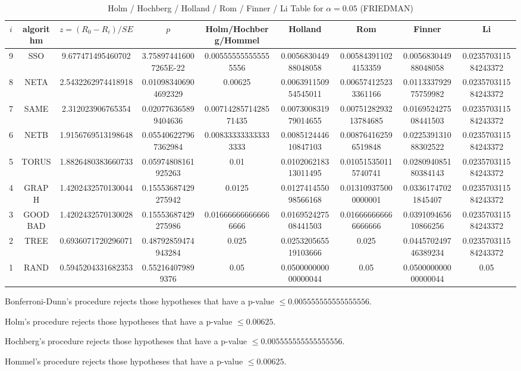 \documentclass[a4paper,10pt]{article}
\begin{document}
\begin{landscape}
\begin{table}[!htp]
\centering\scriptsize
\caption{Holm / Hochberg / Holland / Rom / Finner / Li Table for $\alpha=0.05$ (FRIEDMAN)}
\begin{tabular}{ccccccccc}
$i$&algorithm&$z=(R_0 - R_i)/SE$&$p$&Holm/Hochberg/Hommel&Holland&Rom&Finner&Li\\
\hline
9& SSO&9.677471495460702&3.758974416007265E-22&0.005555555555555556&0.005683044988048058&0.005843911024153359&0.005683044988048058&0.023570311584243372\\
8& NETA&2.5432262974418918&0.010983406904692329&0.00625&0.006391150954545011&0.006574125233361166&0.011333792975759982&0.023570311584243372\\
7& SAME&2.312023906765354&0.020776365899404636&0.0071428571428571435&0.007300831979014655&0.0075128293213784685&0.016952427508441503&0.023570311584243372\\
6& NETB&1.9156769513198648&0.055406227967362984&0.008333333333333333&0.008512444610847103&0.008764162596519848&0.022539131088302522&0.023570311584243372\\
5& TORUS&1.8826480383660733&0.05974808161925263&0.01&0.010206218313011495&0.010515350115740741&0.028094085180384143&0.023570311584243372\\
4& GRAPH&1.4202432570130044&0.15553687429275942&0.0125&0.012741455098566168&0.013109375000000001&0.03361747021845407&0.023570311584243372\\
3& GOODBAD&1.4202432570130028&0.15553687429275986&0.016666666666666666&0.016952427508441503&0.016666666666666666&0.039109465610866256&0.023570311584243372\\
2& TREE&0.6936071720296071&0.48792859474943284&0.025&0.025320565519103666&0.025&0.044570249746389234&0.023570311584243372\\
1& RAND&0.5945204331682353&0.552164079899376&0.05&0.050000000000000044&0.05&0.050000000000000044&0.05\\
\hline
\end{tabular}
\end{table}
Bonferroni-Dunn's procedure rejects those hypotheses that have a p-value $\le0.005555555555555556$.


Holm's procedure rejects those hypotheses that have a p-value $\le0.00625$.


Hochberg's procedure rejects those hypotheses that have a p-value $\le0.005555555555555556$.


Hommel's procedure rejects those hypotheses that have a p-value $\le0.00625$.



\end{landscape}
\end{document}
